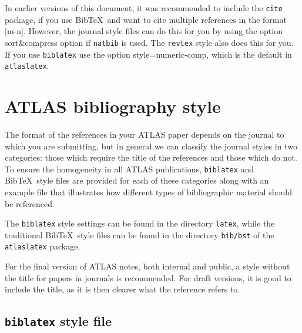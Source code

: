 \documentclass[UKenglish, texlive=2016]{\ATLASLATEXPATH atlasdoc}
\newcommand*{\BibTeX}{Bib\TeX}
\newcommand{\File}[1]{\texttt{#1}\xspace}
\newcommand{\Option}[1]{\textsf{#1}\xspace}
\newcommand{\Package}[1]{\texttt{#1}\xspace}
\begin{document}
In earlier versions of this document, it was recommended to include the \Package{cite} package,
if you use \BibTeX\ and want to cite multiple references in the format [m-n].
However, the journal style files can do this for you by using the option \Option{sort\&compress} option if \Package{natbib} is used.
The \texttt{revtex} style also does this for you.
If you use \texttt{biblatex} use the option \Option{style=numeric-comp},
which is the default in \Package{atlaslatex}.


\section{ATLAS bibliography style}
\label{sec:atlasbst}

The format of the references in your ATLAS paper depends on the journal to which you are submitting,
but in general we can classify the journal styles in two categories:
those which require the title of the references and those which do not.
To ensure the homogeneity in all ATLAS publications,
\Package{biblatex} and \BibTeX\ style files are provided for each of these categories
along with an example file that illustrates how different types of bibliographic material should be referenced.

The \Package{biblatex} style settings can be found in the directory \File{latex},
while the traditional \BibTeX\ style files can be found in the directory \File{bib/bst} of the \Package{atlaslatex} package.

For the final version of ATLAS notes, both internal and public, a style without the title for papers in journals is recommended.
For draft versions, it is good to include the title, as it is then clearer what the reference refers to.


\subsection{\Package{biblatex} style file}
\end{document}
